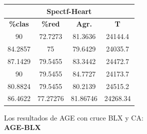 \documentclass[11pt,a4paper]{article}
\theoremstyle{definition}
\begin{document}
\begin{tabbing}
{		\begin{tabular}{|c|c|c|c|}
			\hline
			\multicolumn{4}{|c|}{\textbf{Spectf-Heart}} \\ \hline
			\textbf{\%clas} & \textbf{\%red} & \textbf{Agr.} & \textbf{T} \\ \hline 
			90 & 72.7273 & 81.3636 & 24144.4\\ \hline
84.2857 & 75 & 79.6429 & 24035.7\\ \hline
87.1429 & 79.5455 & 83.3442 & 24472.7\\ \hline
90 & 79.5455 & 84.7727 & 24173.7\\ \hline
80.8824 & 79.5455 & 80.2139 & 24515.2\\ \hline
86.4622 & 77.27276 & 81.86746 & 24268.34\\ \hline
		\end{tabular}
		}
	\end{tabbing}
	
	Los resultados de AGE con cruce BLX y CA: ~\\
	
	\textbf{AGE-BLX}
	
\end{document}
